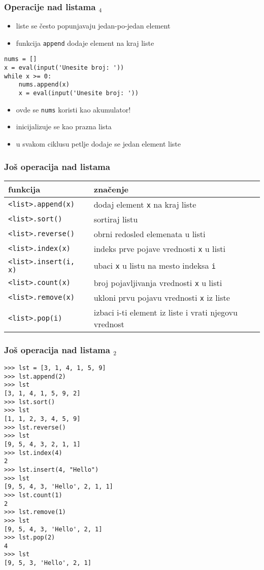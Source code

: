 \documentclass[utf8,compress]{beamer}
\begin{document}
\begin{frame}[fragile]
  \frametitle{Operacije nad listama $_4$}
  \begin{itemize}
    \item liste se često popunjavaju jedan-po-jedan element
    \item funkcija \texttt{append} dodaje element na kraj liste
  \end{itemize}
\begin{verbatim}
nums = []
x = eval(input('Unesite broj: '))
while x >= 0:
    nums.append(x)
    x = eval(input('Unesite broj: '))
\end{verbatim}
  \begin{itemize}
    \item ovde se \texttt{nums} koristi kao akumulator!
    \item inicijalizuje se kao prazna lista
    \item u svakom ciklusu petlje dodaje se jedan element liste
  \end{itemize}
\end{frame}

\begin{frame}[fragile,shrink=5]
  \frametitle{Još operacija nad listama}
\begin{center}
\begin{tabular}{l|l}
\textbf{funkcija} & \textbf{značenje} \\ \hline
\texttt{<list>.append(x)} & dodaj element \texttt{x} na kraj liste \\
\texttt{<list>.sort()} & sortiraj listu \\
\texttt{<list>.reverse()} & obrni redosled elemenata u listi \\
\texttt{<list>.index(x)} & indeks prve pojave vrednosti \texttt{x} u listi \\
\texttt{<list>.insert(i, x)} & ubaci \texttt{x} u listu na mesto indeksa \texttt{i} \\
\texttt{<list>.count(x)} & broj pojavljivanja vrednosti \texttt{x} u listi \\
\texttt{<list>.remove(x)} & ukloni prvu pojavu vrednosti \texttt{x} iz liste \\
\texttt{<list>.pop(i)} & izbaci i-ti element iz liste i vrati njegovu vrednost
\end{tabular}
\end{center}
\end{frame}

\begin{frame}[fragile,shrink=5]
  \frametitle{Još operacija nad listama $_2$}
\begin{verbatim}
>>> lst = [3, 1, 4, 1, 5, 9]
>>> lst.append(2)
>>> lst
[3, 1, 4, 1, 5, 9, 2]
>>> lst.sort()
>>> lst
[1, 1, 2, 3, 4, 5, 9]
>>> lst.reverse()
>>> lst
[9, 5, 4, 3, 2, 1, 1]
>>> lst.index(4)
2
>>> lst.insert(4, "Hello")
>>> lst
[9, 5, 4, 3, 'Hello', 2, 1, 1]
>>> lst.count(1)
2
>>> lst.remove(1)
>>> lst
[9, 5, 4, 3, 'Hello', 2, 1]
>>> lst.pop(2)
4
>>> lst
[9, 5, 3, 'Hello', 2, 1]
\end{verbatim}
\end{frame}
\end{document}
